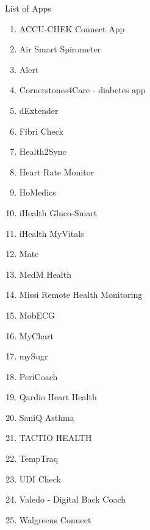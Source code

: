 \documentclass{article}
\begin{document}
\begin{center}
\LARGE List of Apps
\end{center}
\begin{enumerate}
\item ACCU-CHEK Connect App
\item Air Smart Spirometer
\item Alert
\item Cornerstones4Care - diabetes app
\item dExtender
\item Fibri Check
\item Health2Sync
\item Heart Rate Monitor
\item HoMedics
\item iHealth Gluco-Smart
\item iHealth MyVitals
\item Mate
\item MedM Health
\item Missi Remote Health Monitoring
\item MobECG
\item MyChart
\item mySugr
\item PeriCoach
\item Qardio Heart Health
\item SaniQ Asthma
\item TACTIO HEALTH
\item TempTraq
\item UDI Check
\item Valedo - Digital Back Coach
\item Walgreens Connect
\end{enumerate}
\end{document}
